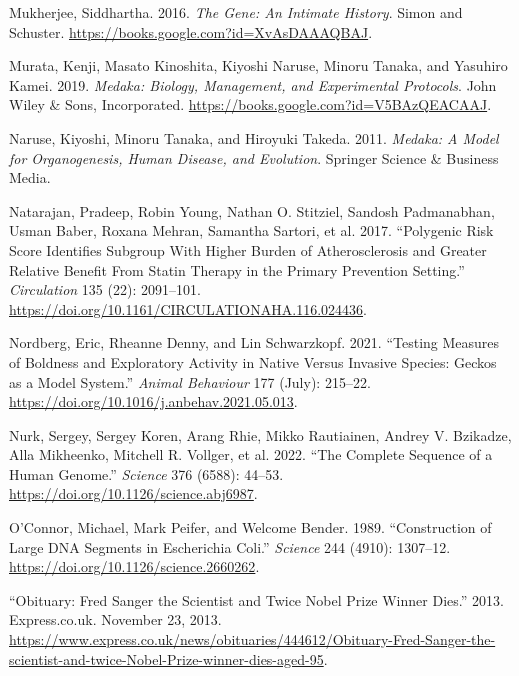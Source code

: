 \documentclass[
]{book}
\newlength{\cslhangindent}
\newlength{\cslentryspacingunit} %
\newenvironment{CSLReferences}[2] %
 {%
  \setlength{\parindent}{0pt}
  \ifodd #1
  \let\oldpar\par
  \def\par{\hangindent=\cslhangindent\oldpar}
  \fi
  \setlength{\parskip}{#2\cslentryspacingunit}
 }%
 {}
\begin{document}
\begin{CSLReferences}{1}{0}
\leavevmode{}%
Mukherjee, Siddhartha. 2016. \emph{The {Gene}: {An Intimate History}}. {Simon and Schuster}. \url{https://books.google.com?id=XvAsDAAAQBAJ}.

\leavevmode{}%
Murata, Kenji, Masato Kinoshita, Kiyoshi Naruse, Minoru Tanaka, and Yasuhiro Kamei. 2019. \emph{Medaka: {Biology}, {Management}, and {Experimental Protocols}}. {John Wiley \& Sons, Incorporated}. \url{https://books.google.com?id=V5BAzQEACAAJ}.

\leavevmode{}%
Naruse, Kiyoshi, Minoru Tanaka, and Hiroyuki Takeda. 2011. \emph{Medaka: A Model for Organogenesis, Human Disease, and Evolution}. {Springer Science \& Business Media}.

\leavevmode{}%
Natarajan, Pradeep, Robin Young, Nathan O. Stitziel, Sandosh Padmanabhan, Usman Baber, Roxana Mehran, Samantha Sartori, et al. 2017. {``Polygenic {Risk Score Identifies Subgroup With Higher Burden} of {Atherosclerosis} and {Greater Relative Benefit From Statin Therapy} in the {Primary Prevention Setting}.''} \emph{Circulation} 135 (22): 2091--101. \url{https://doi.org/10.1161/CIRCULATIONAHA.116.024436}.

\leavevmode{}%
Nordberg, Eric, Rheanne Denny, and Lin Schwarzkopf. 2021. {``Testing Measures of Boldness and Exploratory Activity in Native Versus Invasive Species: Geckos as a Model System.''} \emph{Animal Behaviour} 177 (July): 215--22. \url{https://doi.org/10.1016/j.anbehav.2021.05.013}.

\leavevmode{}%
Nurk, Sergey, Sergey Koren, Arang Rhie, Mikko Rautiainen, Andrey V. Bzikadze, Alla Mikheenko, Mitchell R. Vollger, et al. 2022. {``The Complete Sequence of a Human Genome.''} \emph{Science} 376 (6588): 44--53. \url{https://doi.org/10.1126/science.abj6987}.

\leavevmode{}%
O'Connor, Michael, Mark Peifer, and Welcome Bender. 1989. {``Construction of {Large DNA Segments} in {Escherichia} Coli.''} \emph{Science} 244 (4910): 1307--12. \url{https://doi.org/10.1126/science.2660262}.

\leavevmode{}%
{``Obituary: {Fred Sanger} the Scientist and Twice {Nobel Prize} Winner Dies.''} 2013. {Express.co.uk}. November 23, 2013. \url{https://www.express.co.uk/news/obituaries/444612/Obituary-Fred-Sanger-the-scientist-and-twice-Nobel-Prize-winner-dies-aged-95}.


\end{CSLReferences}
\end{document}
